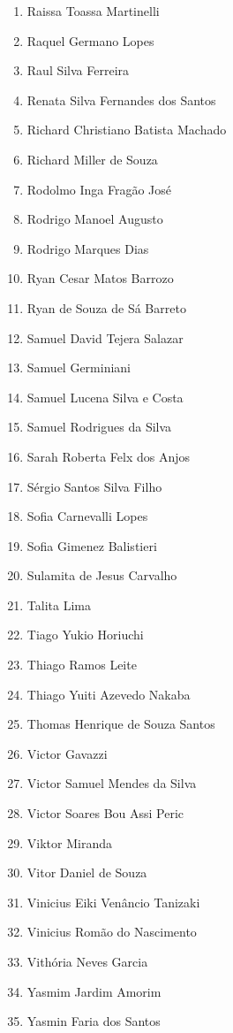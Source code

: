 \documentclass[
  letterpaper,
  DIV=11,
  numbers=noendperiod]{scrreprt}
\begin{document}
\begin{enumerate}
  Raissa Souza Santos
\item
  Raissa Toassa Martinelli
\item
  Raquel Germano Lopes
\item
  Raul Silva Ferreira
\item
  Renata Silva Fernandes dos Santos
\item
  Richard Christiano Batista Machado
\item
  Richard Miller de Souza
\item
  Rodolmo Inga Fragão José
\item
  Rodrigo Manoel Augusto
\item
  Rodrigo Marques Dias
\item
  Ryan Cesar Matos Barrozo
\item
  Ryan de Souza de Sá Barreto
\item
  Samuel David Tejera Salazar
\item
  Samuel Germiniani
\item
  Samuel Lucena Silva e Costa
\item
  Samuel Rodrigues da Silva
\item
  Sarah Roberta Felx dos Anjos
\item
  Sérgio Santos Silva Filho
\item
  Sofia Carnevalli Lopes
\item
  Sofia Gimenez Balistieri
\item
  Sulamita de Jesus Carvalho
\item
  Talita Lima
\item
  Tiago Yukio Horiuchi
\item
  Thiago Ramos Leite
\item
  Thiago Yuiti Azevedo Nakaba
\item
  Thomas Henrique de Souza Santos
\item
  Victor Gavazzi
\item
  Victor Samuel Mendes da Silva
\item
  Victor Soares Bou Assi Peric
\item
  Viktor Miranda
\item
  Vitor Daniel de Souza
\item
  Vinicius Eiki Venâncio Tanizaki
\item
  Vinicius Romão do Nascimento
\item
  Vithória Neves Garcia
\item
  Yasmim Jardim Amorim
\item
  Yasmin Faria dos Santos
\end{enumerate}
\end{document}
